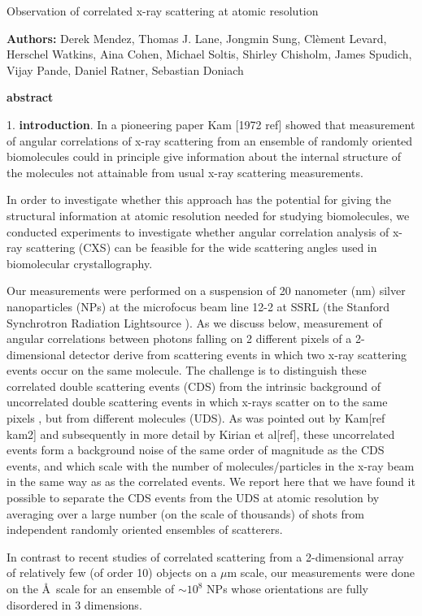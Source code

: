 \documentclass [11pt,fleqn]{article}
\def \hfb {\hfill\break}
\begin{document}
 
 \hspace{1cm}{\bf New Title:} Observation  of correlated x-ray scattering at atomic resolution\hfb
 
{\bf Authors:} Derek Mendez, Thomas J. Lane, Jongmin Sung,  Cl\`ement Levard, Herschel Watkins, Aina Cohen, Michael Soltis, Shirley Chisholm, James Spudich, Vijay Pande,  Daniel Ratner, Sebastian Doniach

{\bf abstract}


1. {\bf introduction}.\hfb
In a pioneering paper  Kam [1972 ref] showed  that measurement of angular correlations of x-ray scattering from an ensemble of randomly oriented biomolecules could in principle give information about the internal structure of the molecules not attainable from usual x-ray scattering measurements. 

In order to investigate whether this approach has the potential for giving  the structural information at atomic resolution needed for studying biomolecules, we conducted  experiments to investigate whether angular correlation analysis of x-ray scattering (CXS) can be  feasible for the wide scattering angles used in biomolecular crystallography.

Our measurements were performed on a suspension of 20 nanometer (nm) silver nanoparticles (NPs) at the microfocus beam line 12-2 at SSRL (the Stanford Synchrotron Radiation Lightsource ). As we discuss below, measurement of angular correlations between photons falling on 2 different pixels of a 2-dimensional detector derive from scattering events in which two x-ray  scattering events occur on  the same molecule.  The challenge is to distinguish these correlated double scattering events (CDS) from the intrinsic background of uncorrelated double scattering events in which x-rays scatter on to the same pixels , but from different molecules (UDS). As was  pointed out by Kam[ref kam2] and subsequently  in more detail by  Kirian et al[ref], these uncorrelated events form a background noise of the same order of magnitude as the CDS events, and which scale with the number of molecules/particles in the x-ray beam in the same way as as the correlated events. We report  here that we have found it possible to separate the CDS events from the UDS at atomic resolution  by averaging over a large number (on the scale of thousands) of shots from  independent randomly  oriented  ensembles of scatterers. 

In contrast to recent studies of correlated scattering from a 2-dimensional array of relatively few (of order 10) objects on a $\mu$m scale, our measurements were done on the \AA\ scale for an ensemble of $\sim 10^8$ NPs whose orientations are fully disordered in 3 dimensions. 
\end{document}
